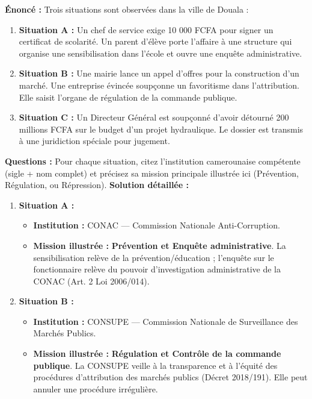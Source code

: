 \documentclass[11pt]{article}
\newcommand{\cle}[1]{{\popxbold\color{popdark}#1}}
\begin{document}
\begin{exoresolu}
    \textbf{Énoncé :} Trois situations sont observées dans la ville de Douala :
    \begin{enumerate}
        \item \textbf{Situation A :} Un chef de service exige 10 000 FCFA pour signer un certificat de scolarité. Un parent d'élève porte l'affaire à une structure qui organise une sensibilisation dans l'école et ouvre une enquête administrative.
        \item \textbf{Situation B :} Une mairie lance un appel d'offres pour la construction d'un marché. Une entreprise évincée soupçonne un favoritisme dans l'attribution. Elle saisit l'organe de régulation de la commande publique.
        \item \textbf{Situation C :} Un Directeur Général est soupçonné d'avoir détourné 200 millions FCFA sur le budget d'un projet hydraulique. Le dossier est transmis à une juridiction spéciale pour jugement.
    \end{enumerate}
    \textbf{Questions :} Pour chaque situation, citez l'institution camerounaise compétente (sigle + nom complet) et précisez sa mission principale illustrée ici (Prévention, Régulation, ou Répression).
    \tcblower
    \textbf{Solution détaillée :}
    \begin{enumerate}
        \item \textbf{Situation A :}
            \begin{itemize}
                \item \textbf{Institution :} \cle{CONAC} — Commission Nationale Anti-Corruption.
                \item \textbf{Mission illustrée :} \textbf{Prévention et Enquête administrative}. La sensibilisation relève de la prévention/éducation ; l'enquête sur le fonctionnaire relève du pouvoir d'investigation administrative de la CONAC (Art. 2 Loi 2006/014).
            \end{itemize}
        \item \textbf{Situation B :}
            \begin{itemize}
                \item \textbf{Institution :} \cle{CONSUPE} — Commission Nationale de Surveillance des Marchés Publics.
                \item \textbf{Mission illustrée :} \textbf{Régulation et Contrôle de la commande publique}. La CONSUPE veille à la transparence et à l'équité des procédures d'attribution des marchés publics (Décret 2018/191). Elle peut annuler une procédure irrégulière.

\end{itemize}
\end{enumerate}
\end{exoresolu}
\end{document}
